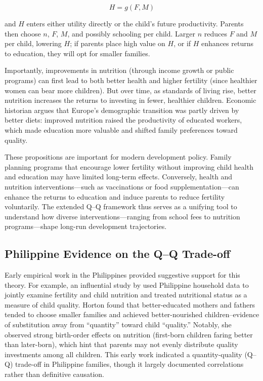 \documentclass[]{AEA}
\begin{document}
\[
H = g(F, M)
\]

and \(H\) enters either utility directly or the child's future
productivity. Parents then choose \(n\), \(F\), \(M\), and possibly
schooling per child. Larger \(n\) reduces \(F\) and \(M\) per child,
lowering \(H\); if parents place high value on \(H\), or if \(H\)
enhances returns to education, they will opt for smaller families.

Importantly, improvements in nutrition (through income growth or public
programs) can first lead to both better health and higher fertility
(since healthier women can bear more children). But over time, as
standards of living rise, better nutrition increases the returns to
investing in fewer, healthier children. Economic historian
\citet{fogel1994economic} argues that Europe's demographic transition
was partly driven by better diets: improved nutrition raised the
productivity of educated workers, which made education more valuable and
shifted family preferences toward quality.

These propositions are important for modern development policy. Family
planning programs that encourage lower fertility without improving child
health and education may have limited long-term effects. Conversely,
health and nutrition interventions---such as vaccinations or food
supplementation---can enhance the returns to education and induce
parents to reduce fertility voluntarily. The extended Q--Q framework
thus serves as a unifying tool to understand how diverse
interventions---ranging from school fees to nutrition programs---shape
long-run development trajectories.

\subsection{Philippine Evidence on the Q–Q Trade-off}

Early empirical work in the Philippines provided suggestive support for
this theory. For example, an influential study by
\citet{horton1986child} used Philippine household data to jointly
examine fertility and child nutrition and treated nutritional status as
a measure of child quality. Horton found that better-educated mothers
and fathers tended to choose smaller families and achieved
better-nourished children--evidence of substitution away from
``quantity'' toward child ``quality.'' Notably, she observed strong
birth-order effects on nutrition (first-born children faring better than
later-born), which hint that parents may not evenly distribute quality
investments among all children. This early work indicated a
quantity-quality (Q--Q) trade-off in Philippine families, though it
largely documented correlations rather than definitive causation.
\end{document}
